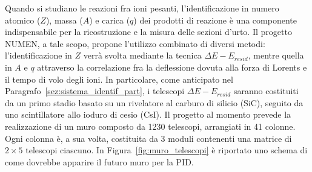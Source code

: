 




Quando si studiano le reazioni fra ioni pesanti, l'identificazione in numero atomico ($Z$), massa ($A$) e carica ($q$) dei prodotti di reazione è una componente indispensabile per la ricostruzione e la misura delle sezioni d'urto.
Il progetto NUMEN, a tale scopo, propone l'utilizzo combinato di diversi metodi: l'identificazione in $Z$ verrà svolta mediante la tecnica $\Delta E - E_{resid}$, mentre quella in $A$ e $q$ attraverso la correlazione fra la deflessione dovuta alla forza di Lorents e il tempo di volo degli ioni.
In particolare, come anticipato nel Paragrafo~\ref{sez:sistema_identif_part}, i telescopi $\Delta E - E_{resid}$ saranno costituiti da un primo stadio basato su un rivelatore al carburo di silicio (SiC), seguito da uno scintillatore allo ioduro di cesio (CsI).
Il progetto al momento prevede la realizzazione di un muro composto da 1230 telescopi, arrangiati in 41 colonne.
Ogni colonna è, a sua volta, costituita da 3 moduli contenenti una matrice di $2 \times 5$ telescopi ciascuno.
In Figura~\ref{fig:muro_telescopi} è riportato uno schema di come dovrebbe apparire il futuro muro per la PID.

